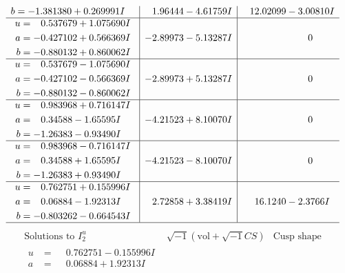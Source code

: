 \documentclass[1p]{elsarticle_modified}
\theoremstyle{definition}
\newcommand{\I}{\sqrt{-1}}
\begin{document}
$$\begin{array}{c|c|c}
\begin{aligned}
b &= -1.381380 + 0.269991 I\end{aligned}
 & \phantom{-}1.96444 - 4.61759 I & \phantom{-}12.02099 - 3.00810 I \\ \hline\begin{aligned}
u &= \phantom{-}0.537679 + 1.075690 I \\
a &= -0.427102 + 0.566369 I \\
b &= -0.880132 + 0.860062 I\end{aligned}
 & -2.89973 - 5.13287 I & \phantom{-0.000000 } 0 \\ \hline\begin{aligned}
u &= \phantom{-}0.537679 - 1.075690 I \\
a &= -0.427102 - 0.566369 I \\
b &= -0.880132 - 0.860062 I\end{aligned}
 & -2.89973 + 5.13287 I & \phantom{-0.000000 } 0 \\ \hline\begin{aligned}
u &= \phantom{-}0.983968 + 0.716147 I \\
a &= \phantom{-}0.34588 - 1.65595 I \\
b &= -1.26383 - 0.93490 I\end{aligned}
 & -4.21523 + 8.10070 I & \phantom{-0.000000 } 0 \\ \hline\begin{aligned}
u &= \phantom{-}0.983968 - 0.716147 I \\
a &= \phantom{-}0.34588 + 1.65595 I \\
b &= -1.26383 + 0.93490 I\end{aligned}
 & -4.21523 - 8.10070 I & \phantom{-0.000000 } 0 \\ \hline\begin{aligned}
u &= \phantom{-}0.762751 + 0.155996 I \\
a &= \phantom{-}0.06884 - 1.92313 I \\
b &= -0.803262 - 0.664543 I\end{aligned}
 & \phantom{-}2.72858 + 3.38419 I & \phantom{-}16.1240 - 2.3766 I\\
 \hline 
 \end{array}$$\newpage$$\begin{array}{c|c|c}  
\text{Solutions to }I^u_{2}& \I (\text{vol} + \sqrt{-1}CS) & \text{Cusp shape}\\
 \hline 
\begin{aligned}
u &= \phantom{-}0.762751 - 0.155996 I \\
a &= \phantom{-}0.06884 + 1.92313 I \\

\end{aligned}
\end{array}$$
\end{document}
